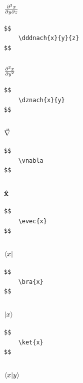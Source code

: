 \documentclass[a4paper]{article}
\begin{document}
\subsubsection{$ \frac{\partial^2 x}{\partial y \partial z}$}

\begin{verbatim}
$$
	\dddnach{x}{y}{z}
$$
\end{verbatim}

\subsubsection{$ \frac{\partial^2 x}{\partial y^2}$}

\begin{verbatim}
$$
	\dznach{x}{y}
$$
\end{verbatim}

\subsubsection{$ \vec{\nabla}$}

\begin{verbatim}
$$
	\vnabla
$$
\end{verbatim}

\subsubsection{$ \mathbf{\hat{x}}$}

\begin{verbatim}
$$
	\evec{x}
$$
\end{verbatim}

\subsubsection{$ \langle x|$}

\begin{verbatim}
$$
	\bra{x}
$$
\end{verbatim}

\subsubsection{$ |x\rangle$}

\begin{verbatim}
$$
	\ket{x}
$$
\end{verbatim}

\subsubsection{$ \langle x| y\rangle$}
\end{document}
